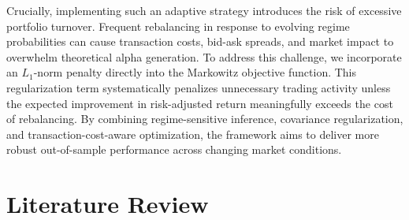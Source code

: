 \documentclass[12pt]{article}
\begin{document}
Crucially, implementing such an adaptive strategy introduces the risk of excessive portfolio turnover. Frequent rebalancing in response to evolving regime probabilities can cause transaction costs, bid-ask spreads, and market impact to overwhelm theoretical alpha generation. To address this challenge, we incorporate an $L_1$-norm penalty directly into the Markowitz objective function. This regularization term systematically penalizes unnecessary trading activity unless the expected improvement in risk-adjusted return meaningfully exceeds the cost of rebalancing. By combining regime-sensitive inference, covariance regularization, and transaction-cost-aware optimization, the framework aims to deliver more robust out-of-sample performance across changing market conditions.

\newpage
\section{Literature Review}


\end{document}
